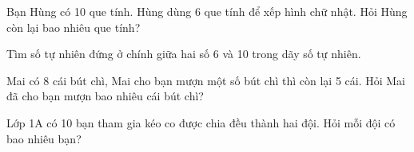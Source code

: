\begin{ex}
Bạn Hùng có 10 que tính. Hùng dùng 6 que tính để xếp hình chữ nhật. Hỏi Hùng còn lại bao nhiêu que tính?
\end{ex}

\begin{ex}
Tìm số tự nhiên đứng ở chính giữa hai số 6 và 10 trong dãy số tự nhiên.
\end{ex}

\begin{ex}
Mai có 8 cái bút chì, Mai cho bạn mượn một số bút chì thì còn lại 5 cái. Hỏi Mai đã cho bạn mượn bao nhiêu cái bút chì?
\end{ex}

\begin{ex}
Lớp 1A có 10 bạn tham gia kéo co được chia đều thành hai đội. Hỏi mỗi đội có bao nhiêu bạn?
\end{ex}
